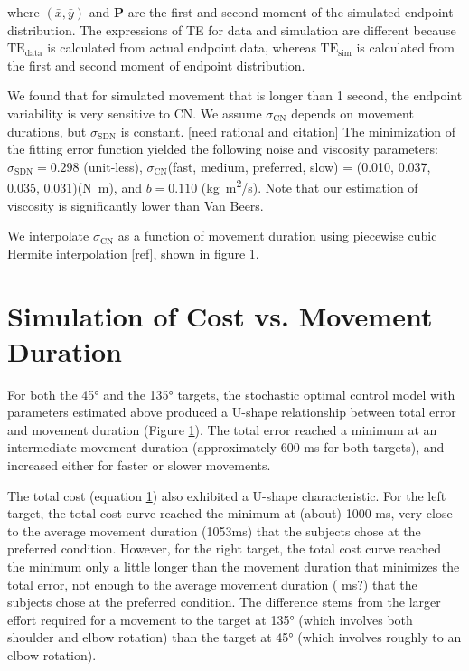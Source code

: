 where $(\bar{x},\bar{y})$ and $\bm{P}$ are the first and second moment of the simulated endpoint distribution. 
The expressions of TE for data and simulation are different because $\text{TE}_{\text{data}}$ is calculated from actual endpoint data, whereas $\text{TE}_{\text{sim}}$ is calculated from the first and second moment of endpoint distribution.
		
We found that for simulated movement that is longer than 1 second, the endpoint variability is very sensitive to CN.
We assume $\sigma_{\text{CN}}$ depends on movement durations, but $\sigma_{\text{SDN}}$ is constant. [need rational and citation] 
The minimization of the fitting error function yielded the following noise and viscosity parameters: $\sigma_{\text{SDN}} = 0.298$ (unit-less), $\sigma_{\text{CN}}$(fast, medium, preferred, slow) = (0.010, 0.037, 0.035, 0.031)(\si{N.m}), and $b=0.110$ (\si{kg.m^2/s}). 
Note that our estimation of viscosity is significantly lower than Van Beers. 

We interpolate $\sigma_{\text{CN}}$ as a function of movement duration using piecewise cubic Hermite interpolation [ref], shown in figure \ref{}.

\section{Simulation of Cost vs. Movement Duration}

For both the \ang{45} and the \ang{135} targets, the stochastic optimal control model with parameters estimated above produced a U-shape relationship between total error and movement duration (Figure \ref{}). The total error reached a minimum at an intermediate movement duration (approximately 600 ms for both targets), and increased either for faster or slower movements. 

The total cost (equation \ref{}) also exhibited a U-shape characteristic. 
For the left target, the total cost curve reached the minimum at (about) 1000 ms, very close to the average movement duration (1053ms)  that the subjects chose at the preferred condition. 
However, for the right target, the total cost curve reached the minimum only a little longer than the movement duration that minimizes the total error, not enough to the average movement duration ( ms?) that the subjects chose at the preferred condition.
The difference stems from the larger effort required for a movement to the target at \ang{135} (which involves both shoulder and elbow rotation) than the target at \ang{45} (which involves roughly to an elbow rotation).





